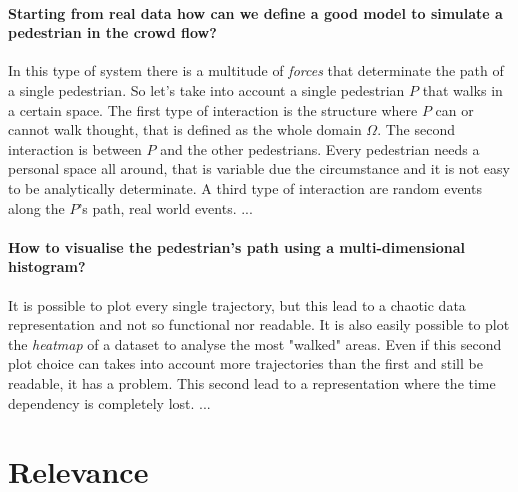 \documentclass[class=article, crop=false]{standalone}
\begin{document}
\paragraph{Starting from real data how can we define a good model to simulate a pedestrian in the crowd flow?}
In this type of system there is a multitude of \emph{forces} that determinate the path of a single pedestrian.
So let's take into account a single pedestrian $P$ that walks in a certain space.
The first type of interaction is the structure where $P$ can or cannot walk thought, that is defined as the whole domain $\Omega$.
The second interaction is between $P$ and the other pedestrians.
Every pedestrian needs a personal space all around, that is variable due the circumstance and it is not easy to be analytically determinate.
A third type of interaction are random events along the $P$'s path, real world events.
...

\paragraph{How to visualise the pedestrian's path using a multi-dimensional histogram?}
It is possible to plot every single trajectory, but this lead to a chaotic data representation and not so functional nor readable.
It is also easily possible to plot the \emph{heatmap} of a dataset to analyse the most "walked" areas.
Even if this second plot choice can takes into account more trajectories than the first and still be readable, it has a problem.
This second lead to a representation where the time dependency is completely lost.
...





\section{Relevance}
\end{document}
